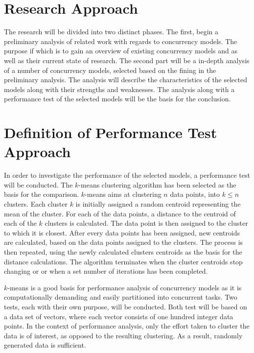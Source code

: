 \makeatletter {}\makeatother
{}
\section{Research Approach}
The research will be divided into two distinct phases. The first, begin a preliminary analysis of related work with regards to concurrency models. The purpose if which is to gain an overview of existing concurrency models and as well as their current state of research. The second part will be a in-depth analysis of a number of concurrency models, selected based on the fining in the preliminary analysis. The analysis will describe the characteristics of the selected models along with their strengths and weaknesses. The analysis along with a performance test of the selected models will be the basis for the conclusion. 

\section{Definition of Performance Test Approach}
In order to investigate the performance of the selected models, a performance test will be conducted. The $k$-means clustering algorithm has been selected as the basis for the comparison. $k$-means aims at clustering $n$ data points, into $k \leq n$ clusters\cite[p. 451]{dataminingconceptsandtechniques}\cite[p. 128]{epstein2011towards}. Each cluster $k$ is initially assigned a random centroid representing the mean of the cluster. For each of the data points, a distance to the centroid of each of the $k$ clusters is calculated. The data point is then assigned to the cluster to which it is closest. After every data points has been assigned, new centroids are calculated, based on the data points assigned to the clusters. The process is then repeated, using the newly calculated clusters centroids as the basis for the distance calculations. The algorithm terminates when the cluster centroids stop changing or or when a set number of iterations has been completed\cite[p. 128]{epstein2011towards}.

$k$-means is a good basis for performance analysis of concurrency models as it is computationally demanding and easily partitioned into concurrent tasks\cite[p. 128]{epstein2011towards}. Two tests, each with their own purpose, will be conducted. Both test will be based on a data set of vectors, where each vector consists of one hundred integer data points. In the context of performance analysis, only the effort taken to cluster the data is of interest, as opposed to the resulting clustering. As a result, randomly generated data is sufficient.

